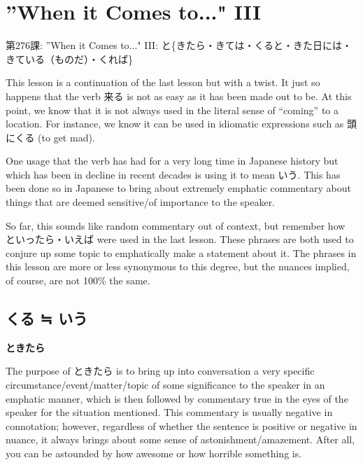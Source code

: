     
\chapter{”When it Comes to\dothyp{}\dothyp{}\dothyp{}" III}

\begin{center}
\begin{Large}
第276課: ”When it Comes to\dothyp{}\dothyp{}\dothyp{}" III: と\{きたら・きては・くると・きた日には・きている（ものだ）・くれば\} 
\end{Large}
\end{center}
 
\par{ This lesson is a continuation of the last lesson but with a twist. It just so happens that the verb 来る is not as easy as it has been made out to be. At this point, we know that it is not always used in the literal sense of “coming” to a location. For instance, we know it can be used in idiomatic expressions such as 頭にくる (to get mad). }

\par{ One usage that the verb has had for a very long time in Japanese history but which has been in decline in recent decades is using it to mean いう. This has been done so in Japanese to bring about extremely emphatic commentary about things that are deemed sensitive\slash of importance to the speaker. }

\par{ So far, this sounds like random commentary out of context, but remember how といったら・いえば were used in the last lesson. These phrases are both used to conjure up some topic to emphatically make a statement about it. The phrases in this lesson are more or less synonymous to this degree, but the nuances implied, of course, are not 100\% the same. }
      
\section{くる ≒ いう}
 
\begin{center}
\textbf{ときたら }
\end{center}

\par{ The purpose of ときたら is to bring up into conversation a very specific circumstance\slash event\slash matter\slash topic of some significance to the speaker in an emphatic manner, which is then followed by commentary true in the eyes of the speaker for the situation mentioned. This commentary is usually negative in connotation; however, regardless of whether the sentence is positive or negative in nuance, it always brings about some sense of astonishment\slash amazement. After all, you can be astounded by how awesome or how horrible something is. }

